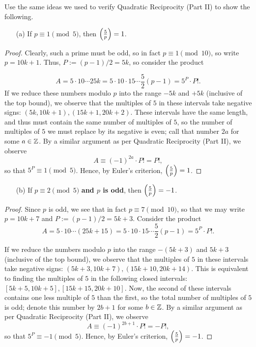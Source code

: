 \documentclass{article}
\newcommand{\leg}[2]{\paren{\frac{#1}{#2}}}
\begin{document}
\begin{exercise}[Chapter 21, \#5]
Use the same ideas we used to verify Quadratic Reciprocity (Part II) to show the following.
\begin{itemize}
    \item[(a)] If $p\equiv 1\pmod 5$, then $\leg 5p = 1$.
\end{itemize}
\begin{proof}
Clearly, such a prime must be odd, so in fact $p\equiv 1 \pmod{10}$, so write $p = 10k+1$. Thus, $P:= (p-1)/2 = 5k$, so consider the product

$$A = 5\cdot 10 \cdots 25k =  5\cdot 10 \cdot 15\cdots \frac 52(p-1) = 5^P \cdot P!.$$
If we reduce these numbers modulo $p$ into the range $-5k$ and $+5k$ (inclusive of the top bound), we observe that the multiples of $5$ in these intervals take negative signs: $(5k, 10k+1), (15k + 1, 20k+2)$. These intervals have the same length, and thus must contain the same number of multiples of $5$, so the number of multiples of $5$ we must replace by its negative is even; call that number $2a$ for some $a\in \mathbb Z$. By a similar argument as per Quadratic Reciprocity (Part II), we observe
$$A \equiv (-1)^{2a} \cdot P! = P!,$$
so that $5^P \equiv 1\pmod 5$. Hence, by Euler's criterion, $\leg 5p = 1$.
\end{proof}
\begin{itemize}
    \item[(b)] If $p\equiv 2\pmod 5$ \textbf{and $p$ is odd}, then $\leg 5p = -1$.
\end{itemize}
\begin{proof}
Since $p$ is odd, we see that in fact $p \equiv 7\pmod{10}$, so that we may write $p = 10k+7$ and $P:=(p-1)/2 = 5k+3$. Consider the product
$$A = 5\cdot 10\cdots (25k+15) = 5\cdot 10 \cdot 15 \cdots \frac 52(p-1) = 5^P\cdot P!.$$

If we reduce the numbers modulo $p$ into the range $-(5k+3)$ and $5k+3$ (inclusive of the top bound), we observe that the multiples of $5$ in these intervals take negative signs: $(5k+3, 10k+7), (15k+10, 20k+14)$. This is equivalent to finding the multiples of $5$ in the following closed intervals: $[5k+5, 10k+5], [15k+15, 20k+10]$. Now, the second of these intervals contains one less multiple of $5$ than the first, so the total number of multiples of $5$ is odd; denote this number by $2b+1$ for some $b\in \mathbb Z$. By a similar argument as per Quadratic Reciprocity (Part II), we observe
$$A \equiv (-1)^{{2b+1}} \cdot P! = -P!,$$
so that $5^P\equiv -1\pmod 5$. Hence, by Euler's criterion, $\leg 5p = -1$.
\end{proof}
\end{exercise}
\end{document}
